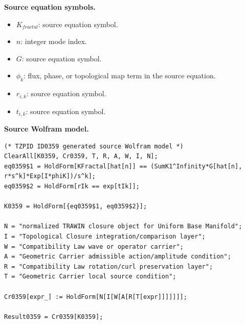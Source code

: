 \begin{minipage}[t]{0.49\linewidth}
\begingroup
\small
\raggedright
\textbf{Source equation symbols.}\par
\begin{itemize}[leftmargin=1.35em,itemsep=1pt,topsep=1pt,parsep=0pt]
    \item $K_{fractal}$: source equation symbol.
    \item $n$: integer mode index.
    \item $G$: source equation symbol.
    \item $\phi_k$: flux, phase, or topological map term in the source equation.
    \item $r_{i,k}$: source equation symbol.
    \item $t_{i,k}$: source equation symbol.
\end{itemize}
\endgroup
\end{minipage}\hfill
\begin{minipage}[t]{0.47\linewidth}
\begingroup
\scriptsize
\raggedright
\textbf{Source Wolfram model.}\par
\begin{Verbatim}[fontsize=\tiny,breaklines=true,breakanywhere=true]
(* TZPID ID0359 generated source Wolfram model *)
ClearAll[K0359, Cr0359, T, R, A, W, I, N];
eq0359$1 = HoldForm[KFractal[hat[n]] == (SumK1^Infinity*G[hat[n], r*s^k]*Exp[I*phiK])/s^k];
eq0359$2 = HoldForm[rIk == exp[tIk]];

K0359 = HoldForm[{eq0359$1, eq0359$2}];

N = "normalized TRAWIN closure object for Uniform Base Manifold";
I = "Topological Closure integration/comparison layer";
W = "Compatibility Law wave or operator carrier";
A = "Geometric Carrier admissible action/amplitude condition";
R = "Compatibility Law rotation/curl preservation layer";
T = "Geometric Carrier local source condition";

Cr0359[expr_] := HoldForm[N[I[W[A[R[T[expr]]]]]]];

Result0359 = Cr0359[K0359];
\end{Verbatim}
\endgroup
\end{minipage}

